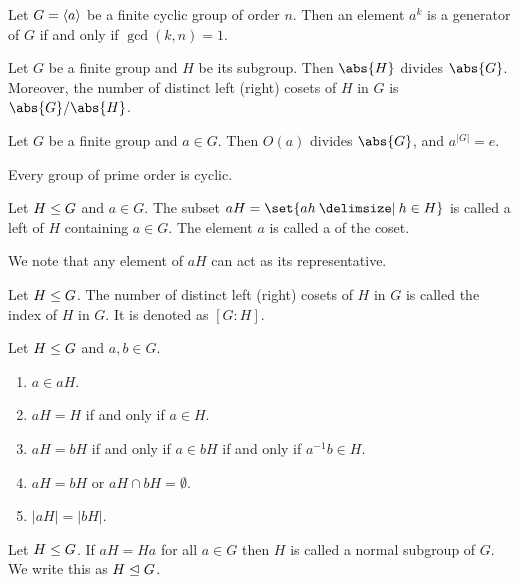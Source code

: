 \documentclass[11pt]{penrose}
\begin{document}
\begin{nthm}
    Let $G = \langle a\rangle$ be a finite cyclic group of order $n$. Then an element $a^k$ is a generator of $G$ if and only if $\gcd(k,n) = 1$.
\end{nthm}

\begin{nthm}[Lagrange]
    Let $G$ be a finite group and $H$ be its subgroup. Then $\abs{H}$ divides $\abs{G}$. Moreover, the number of distinct left (right) cosets of $H$ in $G$ is $\abs{G}/\abs{H}$.
\end{nthm}

\begin{ncor}
    Let $G$ be a finite group and $a \in G$. Then $O(a)$ divides $\abs{G}$, and $a^{|G|} = e$.
\end{ncor}

\begin{ncor}
    Every group of prime order is cyclic.
\end{ncor}

\begin{ndfn}[Cosets]
    Let $H \mathrel{\leq} G$ and $a \in G$. The subset $aH = \set{ah \st h \in H}$ is called a left  of $H$ containing $a \in G$. The element $a$ is called a  of the coset.
\end{ndfn}

We note that any element of $aH$ can act as its representative.

\begin{ndfn}[Index]
    Let $H \mathrel{\leq} G$. The number of distinct left (right) cosets of $H$ in $G$ is called the index of $H$ in $G$. It is denoted as $[G:H]$.
\end{ndfn}

\begin{nthm}
    Let $H \mathrel{\leq} G$ and $a, b \in G$.
    \begin{enumerate}
        \item $a \in aH$.
        \item $aH = H$ if and only if $a \in H$.
        \item $aH = bH$ if and only if $a \in bH$ if and only if $a^{-1} b \in H$.
        \item $aH = bH$ or $aH \cap bH = \emptyset$.
        \item $|aH| = |bH|$.
    \end{enumerate}
\end{nthm}

\begin{ndfn}
    Let $H \mathrel{\leq} G$. If $aH = Ha$ for all $a \in G$ then $H$ is called a normal subgroup of $G$. We write this as $H \mathrel{\trianglelefteq} G$.
\end{ndfn}
\end{document}
